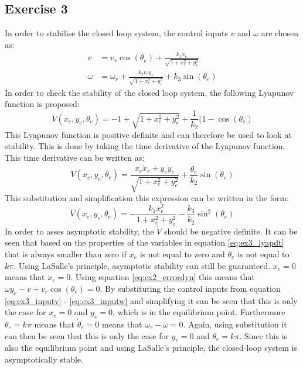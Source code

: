 \subsection{Exercise 3}

In order to stabilise the closed loop system, the control inputs $v$ and $\omega$ are chosen as:
\begin{align}
v &= v_r \cos(\theta_e) + \frac{k_1 x_e}{\sqrt{1+x_e^2 + y_e^2}} \label{eq:ex3_inputv}\\
\omega &= \omega_r + \frac{k_2 v_r y_e}{\sqrt{1 + x_e^2 + y_e^2}} + k_3 \sin(\theta_e) \label{eq:ex3_inputw}
\end{align}
In order to check the stability of the closed loop system, the following Lyapunov function is proposed:
\begin{equation}
    V(x_e, y_e, \theta_e) = -1 + \sqrt{1 + x_e^2 + y_e^2} + \frac{1}{k_2} ( 1 - \cos(\theta_e)
    \label{eq:ex3_lyap}
\end{equation}
This Lyapunov function is positive definite and can therefore be used to look at stability. This is done by taking the time derivative of the Lyapunov function. This time derivative can be written as:
\begin{equation}
    \dot{V}(x_e,y_e,\theta_e) = \frac{x_e \dot{x}_e + y_e \dot{y}_e}{\sqrt{1 + x_e^2 + y_e^2}} + \frac{\dot{\theta}_e}{k_2} \sin(\theta_e)
    \label{eq:ex3_lyapdtstep}
\end{equation}
This substitution and simplification this expression can be written in the form:
\begin{equation}
    \dot{V}(x_e, y_e, \theta_e) = -\frac{k_1 x_e^2}{1+x_e^2 + y_e^2} - \frac{k_3}{k_2} \sin^2(\theta_e)
    \label{eq:ex3_lyapdt}
\end{equation}
In order to asses asymptotic stability, the $\dot{V}$ should be negative definite. It can be seen that based on the properties of the variables in equation \eqref{eq:ex3_lyapdt} that  is always smaller than zero if $x_e$ is not equal to zero and $\theta_e$ is not equal to $k \pi$. Using LaSalle's principle, asymptotic stability can still be guaranteed. $x_e = 0$ means that $\dot{x}_e = 0$. Using equation \eqref{eq:ex2_errordyn} this means that $\omega y_e - v + v_r \cos (\theta_e) = 0$. By substituting the control inputs from equation \eqref{eq:ex3_inputv} - \eqref{eq:ex3_inputw} and simplifying it can be seen that this is only the case for $x_e = 0$ and $y_e = 0$, which is in the equilibrium point. Furthermore $\theta_e = k \pi$ means that $\dot{\theta}_e = 0$ means that $\omega_r - \omega = 0$. Again, using substitution it can then be seen that this is only the case for $y_e = 0$ and $\theta_e = k \pi$. Since this is also the equilibrium point and using LaSalle's principle, the closed-loop system is asymptotically stable.

